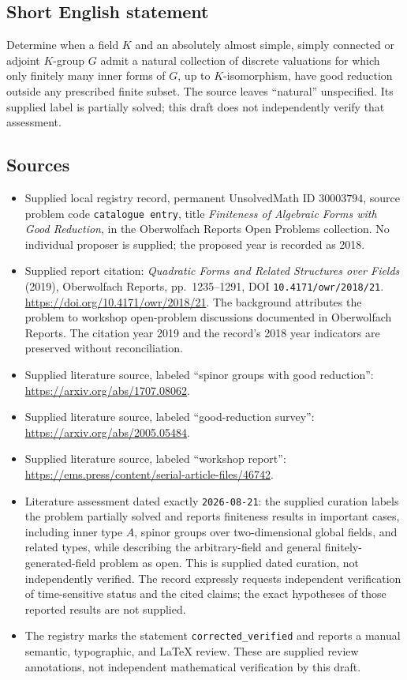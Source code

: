 \documentclass[11pt]{article}
\begin{document}
\subsection{Short English statement}
Determine when a field \(K\) and an absolutely almost simple, simply connected or adjoint \(K\)-group \(G\) admit a natural collection of discrete valuations for which only finitely many inner forms of \(G\), up to \(K\)-isomorphism, have good reduction outside any prescribed finite subset. The source leaves ``natural'' unspecified. Its supplied label is partially solved; this draft does not independently verify that assessment.
\subsection{Sources}
\begin{itemize}
\item Supplied local registry record, permanent UnsolvedMath ID \(30003794\), source problem code \texttt{catalogue entry}, title \emph{Finiteness of Algebraic Forms with Good Reduction}, in the Oberwolfach Reports Open Problems collection. No individual proposer is supplied; the proposed year is recorded as 2018.
\item Supplied report citation: \emph{Quadratic Forms and Related Structures over Fields} (2019), Oberwolfach Reports, pp.~1235--1291, DOI \texttt{10.4171/owr/2018/21}. \url{https://doi.org/10.4171/owr/2018/21}. The background attributes the problem to workshop open-problem discussions documented in Oberwolfach Reports. The citation year 2019 and the record's 2018 year indicators are preserved without reconciliation.
\item Supplied literature source, labeled ``spinor groups with good reduction'': \url{https://arxiv.org/abs/1707.08062}.
\item Supplied literature source, labeled ``good-reduction survey'': \url{https://arxiv.org/abs/2005.05484}.
\item Supplied literature source, labeled ``workshop report'': \url{https://ems.press/content/serial-article-files/46742}.
\item Literature assessment dated exactly \texttt{2026-08-21}: the supplied curation labels the problem partially solved and reports finiteness results in important cases, including inner type \(A\), spinor groups over two-dimensional global fields, and related types, while describing the arbitrary-field and general finitely-generated-field problem as open. This is supplied dated curation, not independently verified. The record expressly requests independent verification of time-sensitive status and the cited claims; the exact hypotheses of those reported results are not supplied.
\item The registry marks the statement \texttt{corrected\_verified} and reports a manual semantic, typographic, and LaTeX review. These are supplied review annotations, not independent mathematical verification by this draft.
\end{itemize}
\end{document}
